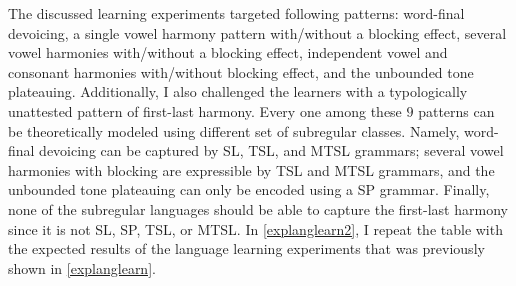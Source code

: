 The discussed learning experiments targeted following patterns: word-final devoicing, a single vowel harmony pattern with/without a blocking effect, several vowel harmonies with/without a blocking effect, independent vowel and consonant harmonies with/without blocking effect, and the unbounded tone plateauing.
Additionally, I also challenged the learners with a typologically unattested pattern of first-last harmony.
Every one among these $9$ patterns can be theoretically modeled using different set of subregular classes.
Namely, word-final devoicing can be captured by SL, TSL, and MTSL grammars; several vowel harmonies with blocking are expressible by TSL and MTSL grammars, and the unbounded tone plateauing can only be encoded using a SP grammar.
Finally, none of the subregular languages should be able to capture the first-last harmony since it is not SL, SP, TSL, or MTSL.
In \ref{explanglearn2}, I repeat the table with the expected results of the language learning experiments that was previously shown in \ref{explanglearn}.


